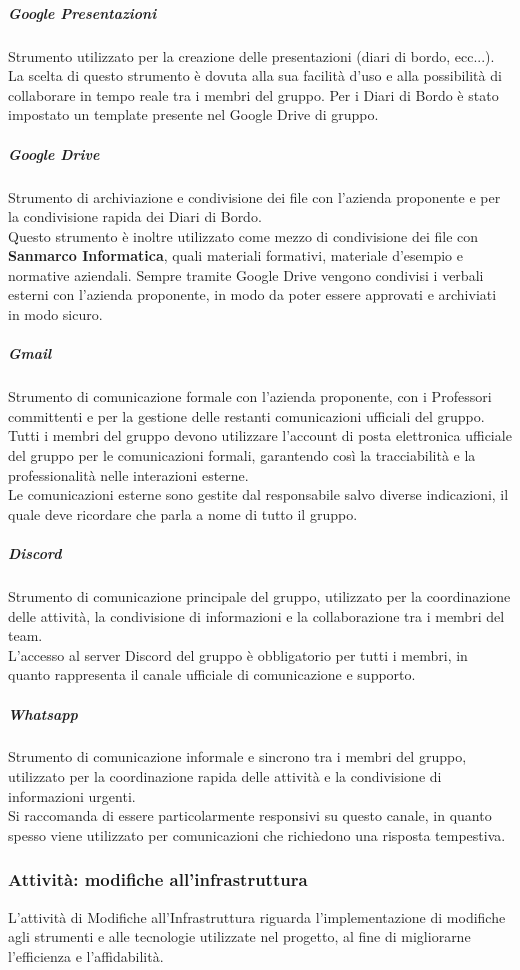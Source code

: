 \documentclass[a4paper,12pt]{article}
\begin{document}
\subparagraph{Google Presentazioni}
Strumento utilizzato per la creazione delle presentazioni (diari di bordo, ecc...). La scelta di questo
strumento è dovuta alla sua facilità d'uso e alla possibilità di collaborare in
tempo reale tra i membri del gruppo. Per i Diari di Bordo è stato impostato un
template presente nel Google Drive di gruppo.

\subparagraph{Google Drive}
Strumento di archiviazione e condivisione dei file con l'azienda proponente e
per la condivisione rapida dei Diari di Bordo. \\ Questo strumento è inoltre
utilizzato come mezzo di condivisione dei file con \textbf{Sanmarco
    Informatica}, quali materiali formativi, materiale d'esempio e normative
aziendali. Sempre tramite Google Drive vengono condivisi i verbali esterni con
l'azienda proponente, in modo da poter essere approvati e archiviati in modo
sicuro.

\subparagraph{Gmail}
Strumento di comunicazione formale con l'azienda proponente, con i Professori
committenti e per la gestione delle restanti comunicazioni ufficiali del
gruppo.\\ Tutti i membri del gruppo devono utilizzare l'account di posta
elettronica ufficiale del gruppo per le comunicazioni formali, garantendo così
la tracciabilità e la professionalità nelle interazioni esterne.\\ Le
comunicazioni esterne sono gestite dal responsabile salvo diverse indicazioni,
il quale deve ricordare che parla a nome di tutto il gruppo.

\subparagraph{Discord}
Strumento di comunicazione principale del gruppo, utilizzato per la
coordinazione delle attività, la condivisione di informazioni e la
collaborazione tra i membri del team.\\ L'accesso al server Discord del gruppo
è obbligatorio per tutti i membri, in quanto rappresenta il canale ufficiale di
comunicazione e supporto.

\subparagraph{Whatsapp}
Strumento di comunicazione informale e sincrono tra i membri del gruppo,
utilizzato per la coordinazione rapida delle attività e la condivisione di
informazioni urgenti.\\ Si raccomanda di essere particolarmente responsivi su
questo canale, in quanto spesso viene utilizzato per comunicazioni che
richiedono una risposta tempestiva.

\subsubsection{Attività: modifiche all'infrastruttura}
L'attività di Modifiche all'Infrastruttura riguarda l'implementazione di
modifiche agli strumenti e alle tecnologie utilizzate nel progetto, al fine di
migliorarne l'efficienza e l'affidabilità.
\end{document}
